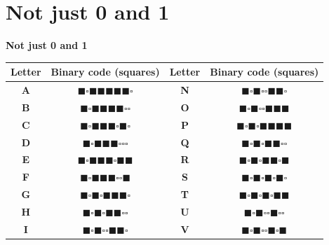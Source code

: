 \documentclass[hidelinks,aspectratio=169]{beamer}
\begin{document}
\section{\textbf{Not just 0 and 1}}
\begin{frame}{\textbf{Not just 0 and 1}}
	\renewcommand{\arraystretch}{1}
	\centering
	\begin{tabular}{|c|c|c|c|}
		\hline
		\textbf{Letter} & \textbf{Binary code (squares)} & \textbf{Letter} & \textbf{Binary code (squares)} \\
		\hline
		\textbf{A} & $\blacksquare\square\blacksquare\blacksquare\blacksquare\blacksquare\blacksquare\square$ & \textbf{N} & $\blacksquare\square\blacksquare\square\square\blacksquare\blacksquare\square$ \\
		\textbf{B} & $\blacksquare\square\blacksquare\blacksquare\blacksquare\blacksquare\square\square$ & \textbf{O} & $\blacksquare\square\blacksquare\square\square\blacksquare\blacksquare\blacksquare$ \\
		\textbf{C} & $\blacksquare\square\blacksquare\blacksquare\blacksquare\square\blacksquare\square$ & \textbf{P} & $\blacksquare\square\blacksquare\square\blacksquare\blacksquare\blacksquare\blacksquare$ \\
		\textbf{D} & $\blacksquare\square\blacksquare\blacksquare\blacksquare\square\square\square$ & \textbf{Q} & $\blacksquare\square\blacksquare\square\blacksquare\blacksquare\square\square$ \\
		\textbf{E} & $\blacksquare\square\blacksquare\blacksquare\blacksquare\square\blacksquare\blacksquare$ & \textbf{R} & $\blacksquare\square\blacksquare\square\blacksquare\blacksquare\square\blacksquare$ \\
		\textbf{F} & $\blacksquare\square\blacksquare\blacksquare\blacksquare\square\square\blacksquare$ & \textbf{S} & $\blacksquare\square\blacksquare\square\blacksquare\square\blacksquare\square$ \\
		\textbf{G} & $\blacksquare\square\blacksquare\square\blacksquare\blacksquare\blacksquare\square$ & \textbf{T} & $\blacksquare\square\blacksquare\square\blacksquare\square\blacksquare\blacksquare$ \\
		\textbf{H} & $\blacksquare\square\blacksquare\square\blacksquare\blacksquare\square\square$ & \textbf{U} & $\blacksquare\square\blacksquare\square\square\blacksquare\square\square$ \\
		\textbf{I} & $\blacksquare\square\blacksquare\square\square\blacksquare\blacksquare\square$ & \textbf{V} & $\blacksquare\square\blacksquare\square\square\blacksquare\square\blacksquare$ \\

\end{tabular}
\end{frame}
\end{document}

